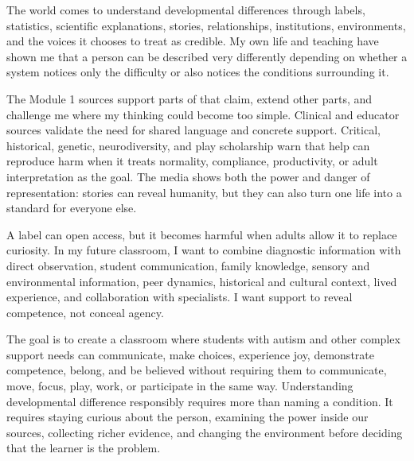 \newpage
{}

The world comes to understand developmental differences through labels, statistics, scientific explanations, stories, relationships, institutions, environments, and the voices it chooses to treat as credible. My own life and teaching have shown me that a person can be described very differently depending on whether a system notices only the difficulty or also notices the conditions surrounding it.

The Module 1 sources support parts of that claim, extend other parts, and challenge me where my thinking could become too simple. Clinical and educator sources validate the need for shared language and concrete support. Critical, historical, genetic, neurodiversity, and play scholarship warn that help can reproduce harm when it treats normality, compliance, productivity, or adult interpretation as the goal. The media shows both the power and danger of representation: stories can reveal humanity, but they can also turn one life into a standard for everyone else.

A label can open access, but it becomes harmful when adults allow it to replace curiosity. In my future classroom, I want to combine diagnostic information with direct observation, student communication, family knowledge, sensory and environmental information, peer dynamics, historical and cultural context, lived experience, and collaboration with specialists. I want support to reveal competence, not conceal agency.

The goal is to create a classroom where students with autism and other complex support needs can communicate, make choices, experience joy, demonstrate competence, belong, and be believed without requiring them to communicate, move, focus, play, work, or participate in the same way. Understanding developmental difference responsibly requires more than naming a condition. It requires staying curious about the person, examining the power inside our sources, collecting richer evidence, and changing the environment before deciding that the learner is the problem.
